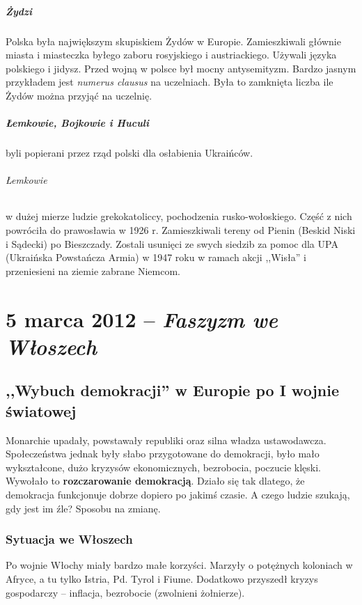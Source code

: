 \documentclass [a4paper, 11pt, oneside]{book}
\begin{document}
            \paragraph{Żydzi} Polska była największym skupiskiem Żydów w Europie. Zamieszkiwali głównie miasta i miasteczka byłego zaboru rosyjskiego i austriackiego. Używali języka polskiego i jidysz. Przed wojną w polsce był mocny antysemityzm. Bardzo jasnym przykładem jest \emph{numerus clausus} na uczelniach. Była to zamknięta liczba ile Żydów można przyjąć na uczelnię.
            \paragraph{Łemkowie, Bojkowie i Huculi} byli popierani przez rząd polski dla osłabienia Ukraińców.
                \subparagraph{Łemkowie} w dużej mierze ludzie grekokatoliccy, pochodzenia rusko-wołoskiego. Część z nich powróciła do prawosławia w 1926 r. Zamieszkiwali tereny od Pienin (Beskid Niski i Sądecki) po Bieszczady. Zostali usunięci ze swych siedzib za pomoc dla UPA (Ukraińska Powstańcza Armia) w 1947 roku w ramach akcji ,,Wisła'' i przeniesieni na ziemie zabrane Niemcom.
\chapter{5 marca 2012 -- \textit{Faszyzm we Włoszech}}
\section{,,Wybuch demokracji'' w Europie po I wojnie światowej}
	Monarchie upadały, powstawały republiki oraz silna władza ustawodawcza. Społeczeństwa jednak były słabo przygotowane do demokracji, było mało wykształcone, dużo kryzysów ekonomicznych, bezrobocia, poczucie klęski. Wywołało to \textbf{rozczarowanie demokracją}. Działo się tak dlatego, że demokracja funkcjonuje dobrze dopiero po jakimś czasie. A czego ludzie szukają, gdy jest im źle? Sposobu na zmianę.
	\subsection{Sytuacja we Włoszech}
		Po wojnie Włochy miały bardzo małe korzyści. Marzyły o potężnych koloniach w Afryce, a tu tylko Istria, Pd. Tyrol i Fiume. Dodatkowo przyszedł kryzys gospodarczy -- inflacja, bezrobocie (zwolnieni żołnierze).
\end{document}
